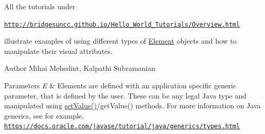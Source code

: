 All the tutorials under

\href{http://bridgesuncc.github.io/Hello_World_Tutorials/Overview.html}{\tt http\+://bridgesuncc.\+github.\+io/\+Hello\+\_\+\+World\+\_\+\+Tutorials/\+Overview.\+html}

illustrate examples of using different types of \hyperlink{classbridges_1_1base_1_1_element}{Element} objects and how to manipulate their visual attributes.

\begin{DoxyAuthor}{Author}
Mihai Mehedint, Kalpathi Subramanian
\end{DoxyAuthor}

\begin{DoxyParams}{Parameters}
{\em E} & Elements are defined with an application specific generic parameter, that is defined by the user. These can be any legal Java type and manipulated using \hyperlink{classbridges_1_1base_1_1_element_ab3cf1241da0bc4c59cea9d6f0fd7aaf4}{set\+Value()}/get\+Value() methods. For more information on Java generics, see for example, \href{https://docs.oracle.com/javase/tutorial/java/generics/types.html}{\tt https\+://docs.\+oracle.\+com/javase/tutorial/java/generics/types.\+html} \\
\hline
\end{DoxyParams}
